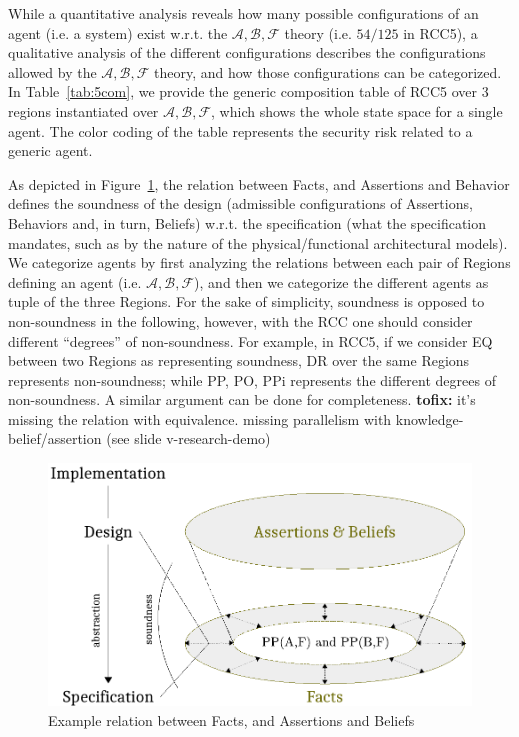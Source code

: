 \documentclass[conference]{IEEEtran}
\newcommand{\fix}[2]{{\color{red} {\bf tofix:} #2}}
\newcommand{\assertionRegion}{\mathcal{A}}
\newcommand{\beliefRegion}{\mathcal{B}}
\newcommand{\factRegion}{\mathcal{F}}
\newcommand{\abf}{\assertionRegion,\beliefRegion,\factRegion}
\begin{document}
While a quantitative analysis reveals how many possible configurations of an
agent (i.e. a system) exist w.r.t. the $\abf$ theory (i.e. $54/125$ in RCC5), a
qualitative analysis of the different configurations describes the
configurations allowed by the $\abf$ theory, and how those configurations can
be categorized.  In Table~\ref{tab:5com}, we provide the generic composition
table of RCC5 over 3 regions instantiated over $\abf$, which shows the whole
state space for a single agent. The color coding of the table represents the
security risk related to a generic agent. 

As depicted in Figure~\ref{fig:soundness}, the relation between Facts, and
Assertions and Behavior defines the soundness of the design (admissible
configurations of Assertions, Behaviors and, in turn, Beliefs) w.r.t. the
specification (what the specification mandates, such as by the nature of the
physical/functional architectural models). We categorize agents by first
analyzing the relations between each pair of Regions defining an agent (i.e.
$\abf$), and then we categorize the different agents as tuple of the three
Regions.  For the sake of simplicity, soundness is opposed to non-soundness in
the following, however, with the RCC one should consider different ``degrees''
of non-soundness. For example, in RCC5, if we consider EQ between two Regions
as representing soundness, DR over the same Regions represents non-soundness;
while PP, PO, PPi represents the different degrees of non-soundness.  A similar
argument can be done for completeness.  \fix{mr}{it's missing the relation with
equivalence. missing parallelism with knowledge-belief/assertion (see slide
v-research-demo)}
\begin{figure}[t]
	\centering
	\includegraphics[width=\columnwidth]{soundness.pdf}
	\caption{Example relation between Facts, and Assertions and Beliefs}
	\label{fig:soundness}
\end{figure}
\end{document}
